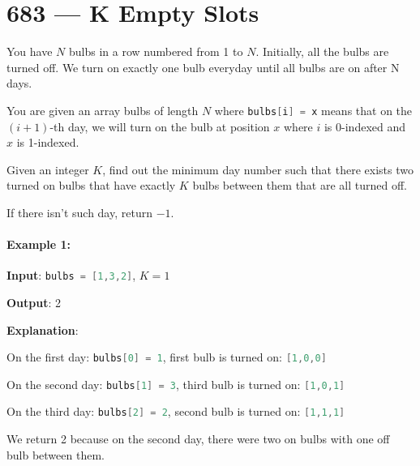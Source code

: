 \section{683 --- K Empty Slots}
You have $N$ bulbs in a row numbered from 1 to $N$. Initially, all the bulbs are turned off. We turn on exactly one bulb everyday until all bulbs are on after N days.

You are given an array bulbs of length $N$ where \lstinline[language=C++, basicstyle=\small\ttfamily, keywordstyle=\bfseries\color{green!40!black}]|bulbs[i] = x| means that on the $(i+1)$-th day, we will turn on the bulb at position $x$ where $i$ is 0-indexed and $x$ is 1-indexed.

Given an integer $K$, find out the minimum day number such that there exists two turned on bulbs that have exactly $K$ bulbs between them that are all turned off.

If there isn't such day, return $-1$.

 

\paragraph{Example 1:}
\begin{flushleft}


\textbf{Input}: \lstinline[language=C++, basicstyle=\small\ttfamily, keywordstyle=\bfseries\color{green!40!black}]|bulbs = [1,3,2]|, $K=1$

\textbf{Output}: 2

\textbf{Explanation}:

On the first day: \lstinline[language=C++, basicstyle=\small\ttfamily, keywordstyle=\bfseries\color{green!40!black}]|bulbs[0] = 1|, first bulb is turned on: \lstinline[language=C++, basicstyle=\small\ttfamily, keywordstyle=\bfseries\color{green!40!black}]|[1,0,0]|

On the second day: \lstinline[language=C++, basicstyle=\small\ttfamily, keywordstyle=\bfseries\color{green!40!black}]|bulbs[1] = 3|, third bulb is turned on: \lstinline[language=C++, basicstyle=\small\ttfamily, keywordstyle=\bfseries\color{green!40!black}]|[1,0,1]|

On the third day: \lstinline[language=C++, basicstyle=\small\ttfamily, keywordstyle=\bfseries\color{green!40!black}]|bulbs[2] = 2|, second bulb is turned on: \lstinline[language=C++, basicstyle=\small\ttfamily, keywordstyle=\bfseries\color{green!40!black}]|[1,1,1]|

We return 2 because on the second day, there were two on bulbs with one off bulb between them.
\end{flushleft}

